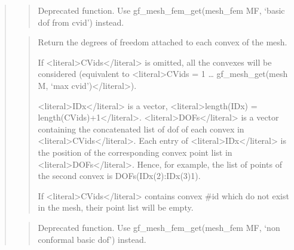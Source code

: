\documentclass[a4paper,11pt,english]{sphinxmanual}
\begin{document}
\begin{quote}
\sphinxAtStartPar
{}
\begin{quote}

\sphinxAtStartPar
Deprecated function. Use gf\_mesh\_fem\_get(mesh\_fem MF, ‘basic dof from cvid’) instead.
\end{quote}

\sphinxAtStartPar
{}
\begin{quote}

\sphinxAtStartPar
Return the degrees of freedom attached to each convex of the mesh.

\sphinxAtStartPar
If \textless{}literal\textgreater{}CVids\textless{}/literal\textgreater{} is omitted, all the convexes will be considered (equivalent
to \textless{}literal\textgreater{}CVids = 1 … gf\_mesh\_get(mesh M, ‘max cvid’)\textless{}/literal\textgreater{}).

\sphinxAtStartPar
\textless{}literal\textgreater{}IDx\textless{}/literal\textgreater{} is a vector, \textless{}literal\textgreater{}length(IDx) = length(CVids)+1\textless{}/literal\textgreater{}.
\textless{}literal\textgreater{}DOFs\textless{}/literal\textgreater{} is a vector containing the concatenated list
of dof of each convex in \textless{}literal\textgreater{}CVids\textless{}/literal\textgreater{}. Each entry of \textless{}literal\textgreater{}IDx\textless{}/literal\textgreater{} is the position
of the corresponding convex point list in \textless{}literal\textgreater{}DOFs\textless{}/literal\textgreater{}. Hence, for example,
the list of points of the second convex is DOFs(IDx(2):IDx(3)\sphinxhyphen{}1).

\sphinxAtStartPar
If \textless{}literal\textgreater{}CVids\textless{}/literal\textgreater{} contains convex \#id which do not exist in the mesh, their
point list will be empty.
\end{quote}

\sphinxAtStartPar
{}
\begin{quote}

\sphinxAtStartPar
Deprecated function. Use gf\_mesh\_fem\_get(mesh\_fem MF, ‘non conformal basic dof’) instead.
\end{quote}


\end{quote}
\end{document}
